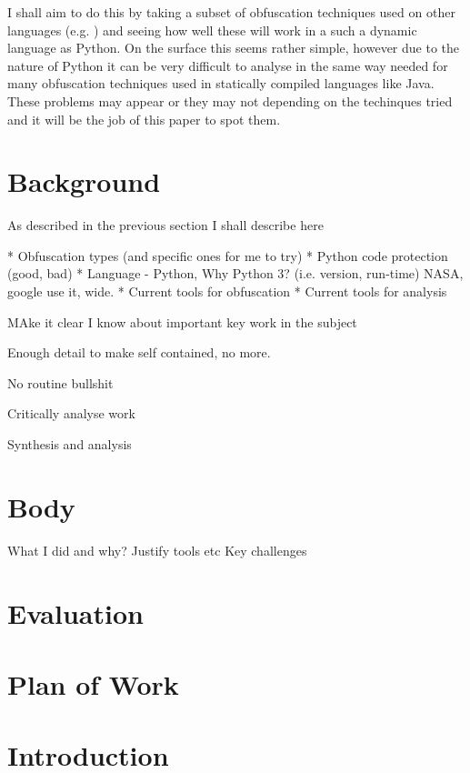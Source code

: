 \documentclass{report}
\begin{document}
I shall aim to do this by taking a subset of obfuscation techniques used on other languages (e.g.
\cite{taxobftrans}) and seeing how well these will work in a such a dynamic language as Python. On the
surface this seems rather simple, however due to the nature of Python it can be very difficult to analyse
\cite[p13]{staticanal} in the same way needed for many obfuscation techniques used in statically compiled
languages like Java. These problems may appear or they may not depending on the techinques tried and it
will be the job of this paper to spot them.

\section{Background}

As described in the previous section I shall describe here 

* Obfuscation types (and specific ones for me to try)
* Python code protection (good, bad)
* Language - Python, Why Python 3? (i.e. version, run-time) NASA, google use it, wide.
* Current tools for obfuscation
* Current tools for analysis

MAke it clear I know about important key work in the subject

Enough detail to make self contained, no more.

No routine bullshit

Critically analyse work

Synthesis and analysis

\section{Body}

What I did and why?
Justify tools etc
Key challenges

\section{Evaluation}



\section{Plan of Work}

\section{Introduction}
\end{document}
